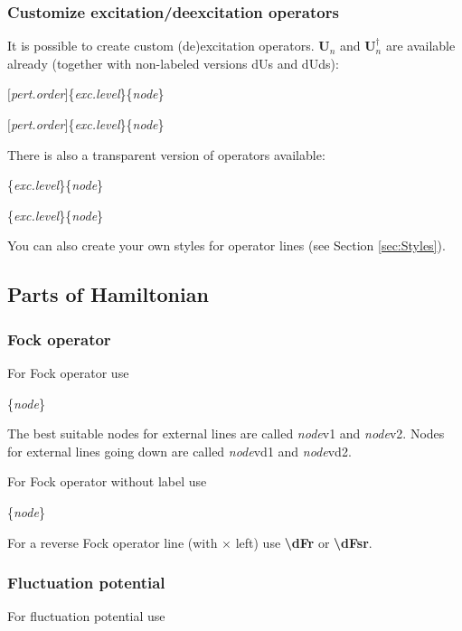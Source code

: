 \documentclass[a4paper]{article}
\newcommand{\myind}{\hspace{10pt}}
\begin{document}
\subsubsection{Customize excitation/deexcitation operators}

It is possible to create custom (de)excitation operators. ${\mathbf U}_n $ and ${\mathbf U}^\dagger_n $ are 
available already (together with non-labeled versions dUs and dUds):

\myind{\bf \textbackslash dU}$[${\it pert.order}$]$\{{\it exc.level}\}\{{\it node}\}

\myind{\bf \textbackslash dUd}$[${\it pert.order}$]$\{{\it exc.level}\}\{{\it node}\}

There is also a transparent version of operators available:

\myind{\bf \textbackslash dTt}\{{\it exc.level}\}\{{\it node}\}

\myind{\bf \textbackslash dTtd}\{{\it exc.level}\}\{{\it node}\}

You can also create your own styles for operator lines (see Section \ref{sec:Styles}).

\subsection{Parts of Hamiltonian}

\subsubsection{Fock operator}

For Fock operator use

\myind{\bf \textbackslash dF}\{{\it node}\}

The best suitable nodes for external lines are called {\it node}v1 and {\it node}v2. 
Nodes for external lines going down are called {\it node}vd1 and {\it node}vd2.

For Fock operator without label use

\myind{\bf \textbackslash dFs}\{{\it node}\}

For a reverse Fock operator line (with $\times$ left) use {\bf \textbackslash dFr} or {\bf \textbackslash dFsr}.

\subsubsection{Fluctuation potential}

For fluctuation potential use
\end{document}

